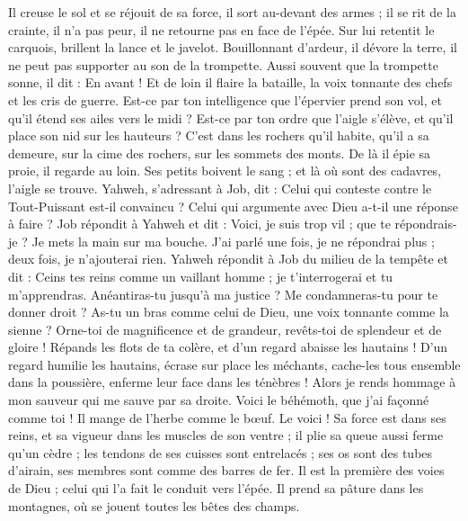 \begin{multicols}{2}
Il creuse le sol et se réjouit de sa force, il sort au-devant des armes ;
il se rit de la crainte, il n'a pas peur, il ne retourne pas en face de l'épée.
Sur lui retentit le carquois, brillent la lance et le javelot.
Bouillonnant d'ardeur, il dévore la terre, il ne peut pas supporter au son de la trompette.
Aussi souvent que la trompette sonne, il dit : En avant ! Et de loin il flaire la bataille, la voix tonnante des chefs et les cris de guerre.
Est-ce par ton intelligence que l'épervier prend son vol, et qu'il étend ses ailes vers le midi ?
Est-ce par ton ordre que l'aigle s'élève, et qu'il place son nid sur les hauteurs ?
C'est dans les rochers qu'il habite, qu'il a sa demeure, sur la cime des rochers, sur les sommets des monts.
De là il épie sa proie, il regarde au loin.
Ses petits boivent le sang ; et là où sont des cadavres, l'aigle se trouve.
Yahweh, s'adressant à Job, dit :
Celui qui conteste contre le Tout-Puissant est-il convaincu ? Celui qui argumente avec Dieu a-t-il une réponse à faire ?
Job répondit à Yahweh et dit :
Voici, je suis trop vil ; que te répondrais-je ? Je mets la main sur ma bouche.
J'ai parlé une fois, je ne répondrai plus ; deux fois, je n'ajouterai rien.
\VerseOne{}Yahweh répondit à Job du milieu de la tempête et dit :
Ceins tes reins comme un vaillant homme ; je t'interrogerai et tu m'apprendras.
Anéantiras-tu jusqu'à ma justice ? Me condamneras-tu pour te donner droit ?
As-tu un bras comme celui de Dieu, une voix tonnante comme la sienne ?
Orne-toi de magnificence et de grandeur, revêts-toi de splendeur et de gloire !
Répands les flots de ta colère, et d'un regard abaisse les hautains !
D'un regard humilie les hautains, écrase sur place les méchants,
cache-les tous ensemble dans la poussière, enferme leur face dans les ténèbres !
Alors je rends hommage à mon sauveur qui me sauve par sa droite.
Voici le béhémoth, que j'ai façonné comme toi ! Il mange de l'herbe comme le bœuf.
Le voici ! Sa force est dans ses reins, et sa vigueur dans les muscles de son ventre ;
il plie sa queue aussi ferme qu'un cèdre ; les tendons de ses cuisses sont entrelacés ;
ses os sont des tubes d'airain, ses membres sont comme des barres de fer.
Il est la première des voies de Dieu ; celui qui l'a fait le conduit vers l'épée.
Il prend sa pâture dans les montagnes, où se jouent toutes les bêtes des champs.

\end{multicols}
